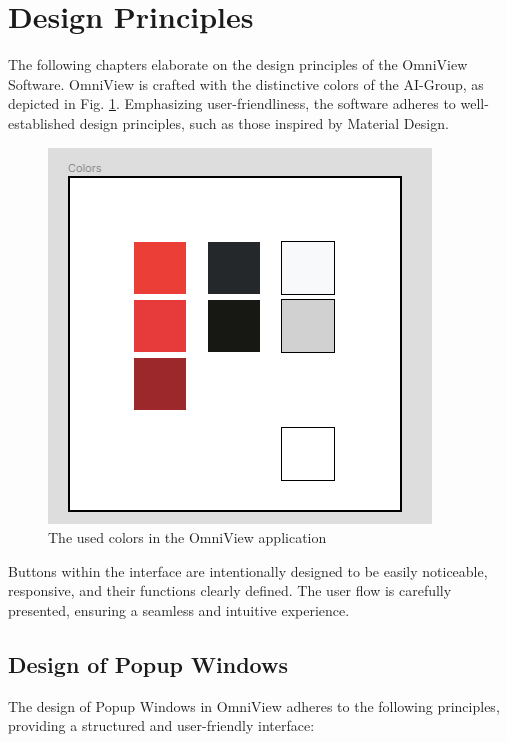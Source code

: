 \documentclass{scrreprt}
\begin{document}
\section{Design Principles}\label{cap:Designprinciples}

The following chapters elaborate on the design principles of the OmniView Software. OmniView is crafted with the distinctive colors of the AI-Group, as depicted in Fig. \ref{fig: AIGroupColors}. Emphasizing user-friendliness, the software adheres to well-established design principles, such as those inspired by Material Design.

\begin{figure}
    \includegraphics[width=.6\textwidth]{assets/pictures/Colors.png}
    \caption[]{The used colors in the OmniView application}
    \label{fig: AIGroupColors}
\end{figure}

Buttons within the interface are intentionally designed to be easily noticeable, responsive, and their functions clearly defined. The user flow is carefully presented, ensuring a seamless and intuitive experience.

\subsection{Design of Popup Windows}\label{cap:Designprinciples_Popupwindows}

The design of Popup Windows in OmniView adheres to the following principles, providing a structured and user-friendly interface:
\end{document}
